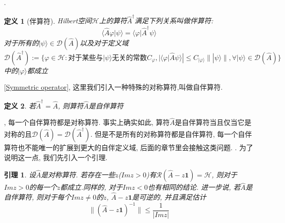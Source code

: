 \documentclass[a4paper,11pt]{article}
\newtheorem{definition}{\hspace{2em}定义}[section]
\newtheorem{lemma}{\hspace{2em}引理}[section]
\begin{document}
.
\begin{definition}[伴算符]\label{Self-adjoint def 2}
  Hilbert空间$\mathcal{H}$上的算符$\hat{A}^{\dag}$满足下列关系叫做伴算符:
\begin{equation}\label{Adjoint operator}
  \langle\hat{A}\varphi|\psi\rangle=\langle\varphi|\hat{A}^{\dag}\psi\rangle
\end{equation}
对于所有的$|\psi\rangle\in\mathcal{D}(\hat{A})$以及对于定义域
\begin{equation*}
  \mathcal{D}(\hat{A}^{\dag}):=\{\varphi\in\mathcal{H}:\text{对于某些与$|\psi\rangle$无关的常数}C_{\varphi}, |\langle\varphi|\hat{A}\psi\rangle|\leq C_{|\varphi\rangle}\||\psi\rangle\|,\forall|\psi\rangle\in\mathcal{D}(\hat{A})\}
\end{equation*}
中的$|\varphi\rangle$都成立
\end{definition}
\ref{Symmetric operator}, 这里我们引入一种特殊的对称算符,叫做自伴算符.
\begin{definition}
  若$\hat{A}^{\dag}=\hat{A}$, 则算符$\hat{A}$是自伴算符
\end{definition}
, 每一个自伴算符都是对称算符. 事实上确实如此, 算符$\hat{A}$是自伴算符当且仅当它是对称的且$\mathcal{D}(\hat{A})=\mathcal{D}(\hat{A}^{\dag})$. 但是不是所有的对称算符都是自伴算符, 每一个自伴算符也不能唯一的扩展到更大的自伴定义域, 后面的章节里会接触这类问题.
. 为了说明这一点, 我们先引入一个引理.
\begin{lemma}\label{sym operator lemma}
  设$\hat{A}$是对称算符. 若存在一些$z$($Im z>0$)有$\mathcal{R}(\hat{A}-z\mathbf{1})=\mathcal{H}$, 则对于$Im z>0$的每一个$z$都成立.同样的, 对于$Im z<0$也有相同的结论. 进一步说, 若$\hat{A}$是自伴算符, 则对于每个$Im z\neq0$的$z$, $\hat{A}-z\mathbf{1}$是可逆的, 并且满足估计
\begin{equation}\label{sym estimate}
  \|(\hat{A}-z\mathbf{1})^{-1}\|\leq\frac{1}{|Im z|}
\end{equation}
\end{lemma}
\end{document}
